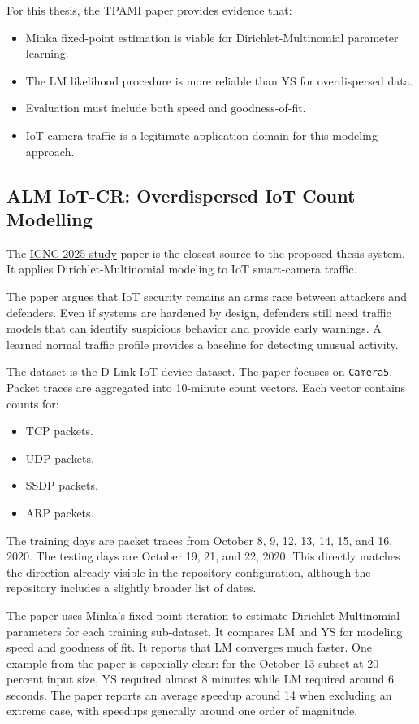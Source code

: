 \documentclass[11pt,a4paper]{article}
\begin{document}
For this thesis, the TPAMI paper provides evidence that:

\begin{itemize}
  \item Minka fixed-point estimation is viable for Dirichlet-Multinomial parameter learning.
  \item The LM likelihood procedure is more reliable than YS for overdispersed data.
  \item Evaluation must include both speed and goodness-of-fit.
  \item IoT camera traffic is a legitimate application domain for this modeling approach.
\end{itemize}

\subsection{ALM IoT-CR: Overdispersed IoT Count Modelling}

The \href{https://doi.org/10.1109/ICNC64010.2025.10993688}{ICNC 2025 study} paper is the closest source to the proposed thesis system. It applies Dirichlet-Multinomial modeling to IoT smart-camera traffic.

The paper argues that IoT security remains an arms race between attackers and defenders. Even if systems are hardened by design, defenders still need traffic models that can identify suspicious behavior and provide early warnings. A learned normal traffic profile provides a baseline for detecting unusual activity.

The dataset is the D-Link IoT device dataset. The paper focuses on \texttt{Camera5}. Packet traces are aggregated into 10-minute count vectors. Each vector contains counts for:

\begin{itemize}
  \item TCP packets.
  \item UDP packets.
  \item SSDP packets.
  \item ARP packets.
\end{itemize}

The training days are packet traces from October 8, 9, 12, 13, 14, 15, and 16, 2020. The testing days are October 19, 21, and 22, 2020. This directly matches the direction already visible in the repository configuration, although the repository includes a slightly broader list of dates.

The paper uses Minka's fixed-point iteration to estimate Dirichlet-Multinomial parameters for each training sub-dataset. It compares LM and YS for modeling speed and goodness of fit. It reports that LM converges much faster. One example from the paper is especially clear: for the October 13 subset at 20 percent input size, YS required almost 8 minutes while LM required around 6 seconds. The paper reports an average speedup around 14 when excluding an extreme case, with speedups generally around one order of magnitude.
\end{document}
